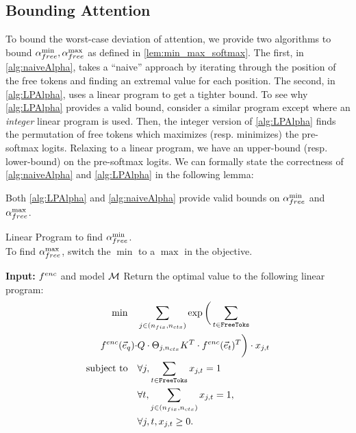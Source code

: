 \subsection{Bounding Attention}
To bound the worst-case deviation of attention, we provide two algorithms to bound ${\alpha}_{free}^{\min}, {\alpha}_{free}^{\max}$ as defined in \cref{lem:min_max_softmax}.
The first, in \cref{alg:naiveAlpha}, takes a ``naive'' approach by iterating through the position of the free tokens and finding an extremal value for each position.
The second, in \cref{alg:LPAlpha}, uses a linear program to get a tighter bound.
To see why \cref{alg:LPAlpha} provides a valid bound, consider a similar program except where an \emph{integer} linear program is used.
Then, the integer version of \cref{alg:LPAlpha} finds the permutation of free tokens which maximizes (resp. minimizes) the pre-softmax logits.
Relaxing to a linear program, we have an upper-bound (resp. lower-bound) on the pre-softmax logits.
We can formally state the correctness of \cref{alg:naiveAlpha} and \cref{alg:LPAlpha} in the following lemma:
\begin{lemma}
	\label{lem:corrAlpha}
	 Both \cref{alg:LPAlpha} and \cref{alg:naiveAlpha} provide valid bounds on ${\alpha}_{free}^{\min}$ and ${\alpha}_{free}^{\max}$.
\end{lemma}
\vspace{-0.2cm}

\begin{algorithm}[tb]
	\caption{
		Linear Program to find ${\alpha}_{free}^{\min}$.\\
		To find ${\alpha}_{free}^{\max}$, switch the $\min$ to a $\max$ in the objective.
	}
	\label{alg:LPAlpha}
	\begin{algorithmic}
	\STATE \textbf{Input:} {$f^{enc}$ and model $\mathcal{M}$}
	\STATE
	\STATE Return the optimal value to the following linear program:
	\begin{align*}
		\min \quad & \sum_{j \in (n_{fix}, {n_{ctx}})} \exp\bigg(\sum_{t \in \texttt{FreeToks}} \\
			f^{enc}(\vec{e}_q) \cdot &Q \cdot \Theta_{j, {n_{ctx}}} K^T \cdot f^{enc}(\vec{e}_t)^T
	\bigg) \cdot x_{j, t} \\
		\text{subject to} \quad
			   & \forall j, \sum_{t \in \texttt{FreeToks}} x_{j, t} = 1 \\
			   & \forall t, \sum_{j \in (n_{fix}, {n_{ctx}})} x_{j, t} = 1, \\
			   &  \forall j, t, x_{j, t} \geq 0.
	\end{align*}
	\end{algorithmic}
\end{algorithm} 

